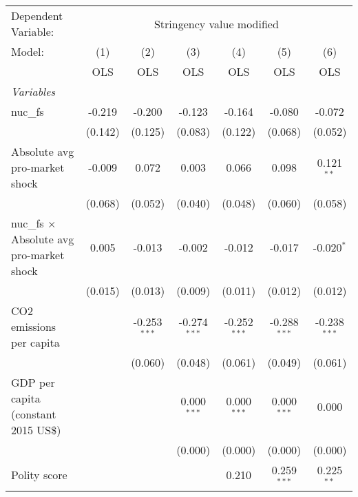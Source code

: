 
\begingroup
\centering
\begin{tabular}{lcccccc}
   \toprule
   Dependent Variable: & \multicolumn{6}{c}{Stringency value modified}\\
   Model:                                           & (1)     & (2)            & (3)            & (4)            & (5)            & (6)\\  
                                                    &  OLS    & OLS            & OLS            & OLS            & OLS            & OLS\\  
   \midrule
   \emph{Variables}\\
   nuc\_fs                                          & -0.219  & -0.200         & -0.123         & -0.164         & -0.080         & -0.072\\   
                                                    & (0.142) & (0.125)        & (0.083)        & (0.122)        & (0.068)        & (0.052)\\   
   Absolute avg pro-market shock                    & -0.009  & 0.072          & 0.003          & 0.066          & 0.098          & 0.121$^{**}$\\   
                                                    & (0.068) & (0.052)        & (0.040)        & (0.048)        & (0.060)        & (0.058)\\   
   nuc\_fs $\times$ Absolute avg pro-market shock   & 0.005   & -0.013         & -0.002         & -0.012         & -0.017         & -0.020$^{*}$\\   
                                                    & (0.015) & (0.013)        & (0.009)        & (0.011)        & (0.012)        & (0.012)\\   
   CO2 emissions per capita                         &         & -0.253$^{***}$ & -0.274$^{***}$ & -0.252$^{***}$ & -0.288$^{***}$ & -0.238$^{***}$\\   
                                                    &         & (0.060)        & (0.048)        & (0.061)        & (0.049)        & (0.061)\\   
   GDP per capita (constant 2015 US\$)              &         &                & 0.000$^{***}$  & 0.000$^{***}$  & 0.000$^{***}$  & 0.000\\   
                                                    &         &                & (0.000)        & (0.000)        & (0.000)        & (0.000)\\   
   Polity score                                     &         &                &                & 0.210          & 0.259$^{***}$  & 0.225$^{**}$\\   

\end{tabular}
